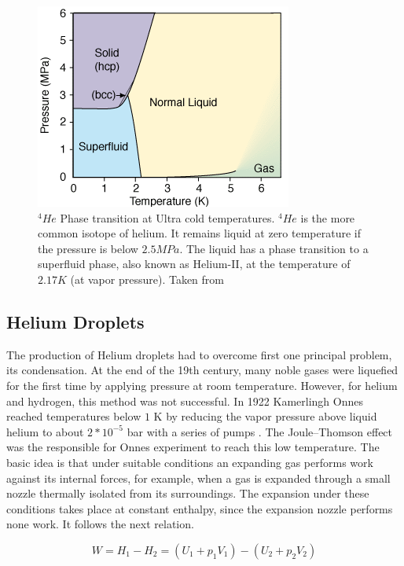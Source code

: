 \begin{figure}[h!]
\centering
\includegraphics[width=8 cm]{../Images/He_temp_phases.png}
\caption[Helium phase diagram]{$^{4}He$ Phase transition at Ultra cold temperatures. $^{4}He$ is the more common isotope of helium. It remains liquid at zero temperature if the pressure is below $2.5 MPa$. The liquid has a phase transition to a superfluid phase, also known as Helium-II, at the temperature of $2.17 K$ (at vapor pressure). Taken from \cite{noauthor_Helium_nodate}}

\end{figure}


\subsection{Helium Droplets}

The production of Helium droplets had to overcome first one principal problem, its condensation. At the end  of the 19th century, many noble gases were liquefied for the first time by applying pressure at room temperature. However, for helium and hydrogen, this method was not successful. In 1922 Kamerlingh Onnes reached temperatures below $1$ K by reducing the vapor pressure above liquid helium to about $2*10^{-5}$ bar with a series of pumps \cite{van_delft_discovery_2010}. The Joule–Thomson effect \cite{weinberger_discovery_2013} was the responsible for Onnes experiment to reach this low temperature. The basic idea is that under suitable conditions an expanding gas performs work against its internal forces, for example, when a gas is expanded through a small nozzle thermally isolated from its surroundings. The expansion under these conditions takes place at constant enthalpy, since the expansion nozzle performs none work. It follows the next relation.

\begin{equation}
W= H_{1}-H_{2} = (U_{1}+p_{1}V_{1})-(U_{2}+p_{2}V_{2})
\end{equation}


